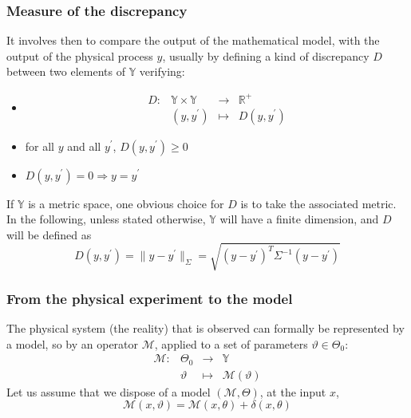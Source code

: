 \documentclass[a4paper,11pt]{article}
\newcommand{\Yspace}{\mathbb{Y}}
\theoremstyle{defi}
\numberwithin{thmCounter}{section}
\begin{document}
\subsubsection{Measure of the discrepancy}

 It involves then to compare the output of the mathematical model, with the output of the physical process $y$, usually by defining a kind of discrepancy $D$ between two elements of $\Yspace$ verifying:
\begin{itemize}
\item 
\begin{equation*}
  \begin{array}{cccc}
    D:& \Yspace \times \Yspace& \longrightarrow&\mathbb{R}^+ \\
     & (y,y^{\prime}) & \longmapsto & D(y, y^{\prime})
  \end{array}
\end{equation*}
\item for all $y$ and all $y^{\prime}$, $D(y, y^{\prime})\geq 0$
\item $D(y, y^{\prime}) = 0 \Rightarrow y = y^{\prime}$
\end{itemize}
If $\Yspace$ is a metric space, one obvious choice for $D$ is to take the associated metric. In the following, unless stated otherwise, $\Yspace$ will have a finite dimension, and $D$ will be defined as
\begin{equation}
  D(y, y^{\prime}) = \|y - y^{\prime}\|_{\Sigma} = \sqrt{(y - y^{\prime})^T\Sigma^{-1}(y - y^{\prime})}
\end{equation}
\subsubsection{From the physical experiment to the model}
\label{ssec:inv_problem}
The physical system (the reality) that is observed can formally be represented by a model, so by an operator $\mathscr{M}$, applied to a set of parameters $\vartheta \in \Theta_0$:
\begin{equation*}
  \begin{array}{llll}
    \mathscr{M} :& \Theta_0 &\longrightarrow& \Yspace \\
                 & \vartheta & \longmapsto& \mathscr{M}(\vartheta)
  \end{array}
\end{equation*}
Let us assume that we dispose of a model $(\mathcal{M}, \Theta)$, at the input $x$, 
\begin{equation*}
    \mathscr{M}(x, \vartheta) = \mathcal{M}(x, \theta) + \delta(x,\theta)
\end{equation*}
\end{document}
